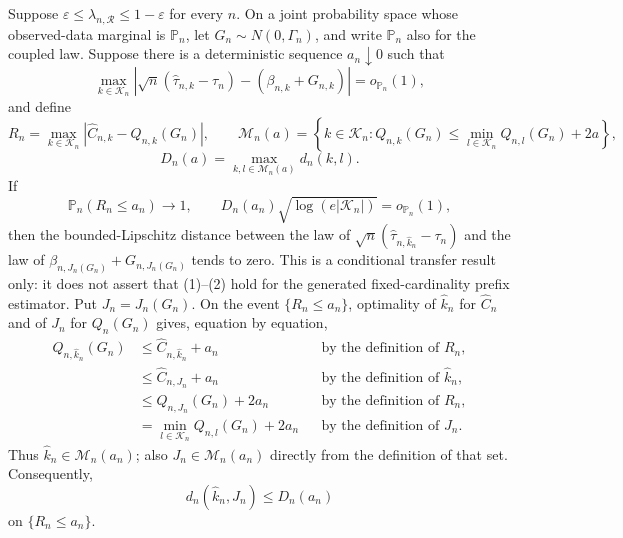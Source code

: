 Suppose \(\varepsilon\leq\lambda_{n,\mathcal R}\leq1-\varepsilon\) for every \(n\).  On a joint probability space whose observed-data marginal is \(\mathbb P_n\), let \(G_n\sim N(0,\Gamma_n)\), and write \(\mathbb P_n\) also for the coupled law.  Suppose there is a deterministic sequence \(a_n\downarrow0\) such that
\[
 \max_{k\in\mathcal K_n}
 \left|
 \sqrt n(\widehat\tau_{n,k}-\tau_n)
 -(\beta_{n,k}+G_{n,k})
 \right|=o_{\mathbb P_n}(1), \tag{1}
\]
and define
\[
 R_n=\max_{k\in\mathcal K_n}
       |\widehat C_{n,k}-Q_{n,k}(G_n)|,
 \qquad
 \mathcal M_n(a)=
 \left\{k\in\mathcal K_n:
 Q_{n,k}(G_n)\leq
 \min_{l\in\mathcal K_n}Q_{n,l}(G_n)+2a
 \right\},
\]
\[
 D_n(a)=\max_{k,l\in\mathcal M_n(a)}d_n(k,l).
\]
If
\[
 \mathbb P_n(R_n\leq a_n)\longrightarrow1,
 \qquad
 D_n(a_n)\sqrt{\log(e|\mathcal K_n|)}
 =o_{\mathbb P_n}(1), \tag{2}
\]
then the bounded-Lipschitz distance between the law of
\(\sqrt n(\widehat\tau_{n,\widehat k_n}-\tau_n)\) and the law of
\(\beta_{n,J_n(G_n)}+G_{n,J_n(G_n)}\) tends to zero.  This is a conditional transfer result only: it does not assert that (1)--(2) hold for the generated fixed-cardinality prefix estimator.
Put \(J_n=J_n(G_n)\).  On the event \(\{R_n\leq a_n\}\), optimality of \(\widehat k_n\) for \(\widehat C_n\) and of \(J_n\) for \(Q_n(G_n)\) gives, equation by equation,
\[
 \begin{aligned}
 Q_{n,\widehat k_n}(G_n)
 &\leq \widehat C_{n,\widehat k_n}+a_n
 &&\text{by the definition of \(R_n\)},\\
 &\leq \widehat C_{n,J_n}+a_n
 &&\text{by the definition of \(\widehat k_n\)},\\
 &\leq Q_{n,J_n}(G_n)+2a_n
 &&\text{by the definition of \(R_n\)},\\
 &=\min_{l\in\mathcal K_n}Q_{n,l}(G_n)+2a_n
 &&\text{by the definition of \(J_n\)}.
 \end{aligned} \tag{3}
\]
Thus \(\widehat k_n\in\mathcal M_n(a_n)\); also \(J_n\in\mathcal M_n(a_n)\) directly from the definition of that set.  Consequently,
\[
 d_n(\widehat k_n,J_n)\leq D_n(a_n) \tag{4}
\]
on \(\{R_n\leq a_n\}\).

